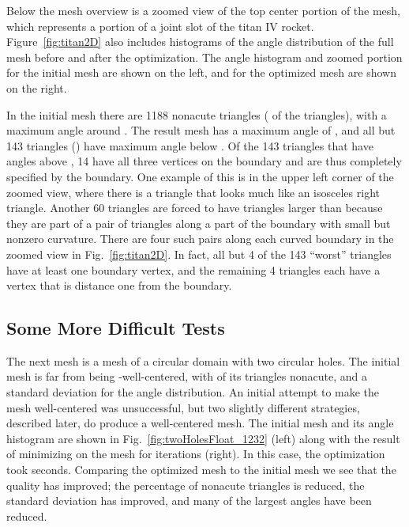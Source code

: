 \documentclass[final]{siamltex}
\begin{document}
Below the mesh overview is a zoomed view of the top center portion of
the mesh, which represents a portion of a joint slot of the titan IV
rocket.  Figure~\ref{fig:titan2D} also includes histograms of the
angle distribution of the full mesh before and after the optimization.
The angle histogram and zoomed portion for the initial mesh are shown
on the left, and for the optimized mesh are shown on the right.

In the initial mesh there are 1188 nonacute triangles
( of the triangles), with a maximum angle around
\textdegree.  The result mesh has a maximum angle of
\textdegree, and all but 143 triangles () have
maximum angle below \textdegree.  Of the 143 triangles that have
angles above \textdegree, 14 have all three vertices on the
boundary and are thus completely specified by the boundary.  One
example of this is in the upper left corner of the zoomed view, where
there is a triangle that looks much like an isosceles right triangle.
Another 60 triangles are forced to have triangles larger than
\textdegree{} because they are part of a pair of triangles along a
part of the boundary with small but nonzero curvature.
There are four such pairs along each
curved boundary in the zoomed view in Fig.~\ref{fig:titan2D}.  In
fact, all but 4 of the 143 ``worst'' triangles have at least one
boundary vertex, and the remaining 4 triangles each have a vertex that
is distance one from the boundary.


\subsection{Some More Difficult Tests} \label{subsec:twoholes}

The next mesh is a mesh of a circular domain with two circular
holes.  The initial mesh is far from being -well-centered,
with  of its triangles nonacute, and a standard deviation
 for the angle distribution.  An initial
attempt to make the mesh well-centered was unsuccessful, but
two slightly different strategies, described later, do produce
a well-centered mesh.  The initial mesh and its angle histogram
are shown in Fig.~\ref{fig:twoHolesFloat_1232} (left)
along with the result of minimizing  on the mesh
for  iterations (right). In this case, the optimization
took  seconds.  Comparing the optimized mesh to
the initial mesh we see that the quality has improved; the
percentage of nonacute triangles is reduced, the standard
deviation has improved, and many of the largest angles
have been reduced.
\end{document}
